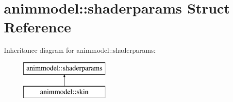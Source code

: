 \hypertarget{structanimmodel_1_1shaderparams}{}\section{animmodel\+:\+:shaderparams Struct Reference}
\label{structanimmodel_1_1shaderparams}
Inheritance diagram for animmodel\+:\+:shaderparams\+:\begin{figure}[H]
\begin{center}
\leavevmode
\includegraphics[height=2.000000cm]{structanimmodel_1_1shaderparams}
\end{center}
\end{figure}
